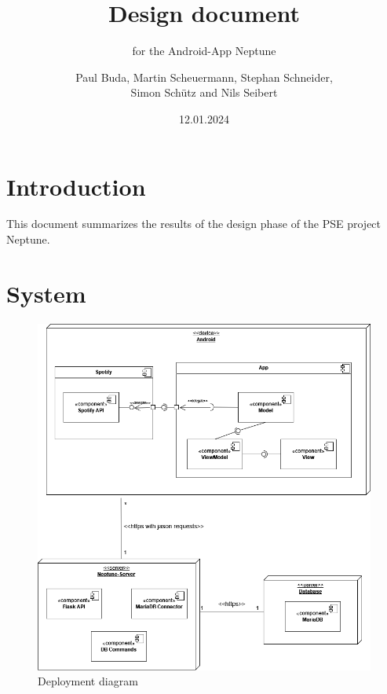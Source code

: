 \documentclass[oneside, nenglish]{sdqtechreport}
\author{Paul Buda, Martin Scheuermann, Stephan Schneider, \\
Simon Schütz and Nils Seibert}
\title{Design document}
\subtitle{for the Android-App Neptune}
\date{12.01.2024}
\begin{document}
\setpdf

\maketitle

\tableofcontents

\cleardoublepage


\chapter{Introduction}
\label{chap:Introduction}

This document summarizes the results of the design phase of the PSE project Neptune.

\chapter{System}
\label{chap:System}

\begin{figure}[h]
    \includegraphics[width = 16cm]{LATEX/Entwurf/Graphics/Component-Diagram.png}
    \caption{Deployment diagram}
    \label{fig:Deployment diagram}
\end{figure}
\end{document}
